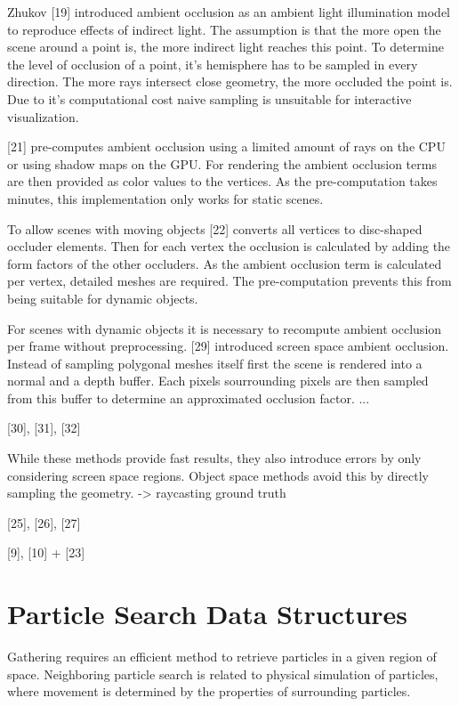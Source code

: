 \documentclass[hyperref,german,diplominf]{cgvpub}
\begin{document}
Zhukov [19] introduced ambient occlusion as an ambient light illumination model to reproduce effects of indirect light.
The assumption is that the more open the scene around a point is, the more indirect light reaches this point. To determine the level of occlusion of a point, it's hemisphere has to be sampled in every direction. The more rays intersect close geometry, the more occluded the point is. Due to it's computational cost naive sampling is unsuitable for interactive visualization.

[21] pre-computes ambient occlusion using a limited amount of rays on the CPU or using shadow maps on the GPU. For rendering the ambient occlusion terms are then provided as color values to the vertices. As the pre-computation takes minutes, this implementation only works for static scenes.

To allow scenes with moving objects [22] converts all vertices to disc-shaped occluder elements. Then for each vertex the occlusion is calculated by adding the form factors of the other occluders. As the ambient occlusion term is calculated per vertex, detailed meshes are required. The pre-computation prevents this from being suitable for dynamic objects.

For scenes with dynamic objects it is necessary to recompute ambient occlusion per frame without preprocessing. [29] introduced screen space ambient occlusion. Instead of sampling polygonal meshes itself first the scene is rendered into a normal and a depth buffer. Each pixels sourrounding pixels are then sampled from this buffer to determine an approximated occlusion factor. ...

[30], [31], [32]

While these methods provide fast results, they also introduce errors by only considering screen space regions.
Object space methods avoid this by directly sampling the geometry. -> raycasting ground truth

[25], [26], [27]

[9], [10] + [23]

\section{Particle Search Data Structures}

Gathering requires an efficient method to retrieve particles in a given region of space. Neighboring particle search is related to physical simulation of particles, where movement is determined by the properties of surrounding particles.
\end{document}
